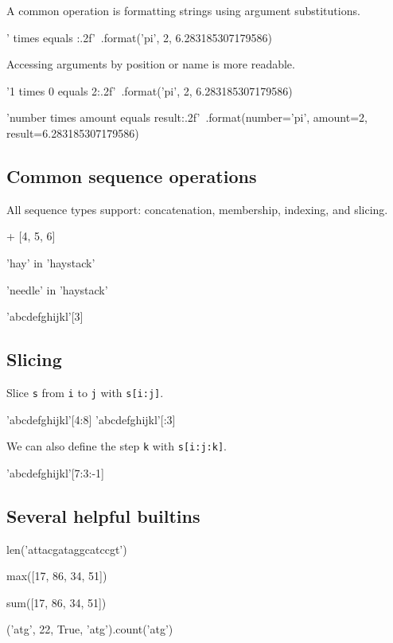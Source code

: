 \documentclass[aspectratio=1610,slidestop]{beamer}
\begin{document}
\begin{pframe}
\vspace{-0.3cm}
A common operation is formatting strings using argument substitutions.
\begin{pyconsole}
'{} times {} equals {:.2f}'\
    .format('pi', 2, 6.283185307179586)
\end{pyconsole}
\medskip
\medskip
Accessing arguments by position or name is more readable.
\begin{pyconsole}
'{1} times {0} equals {2:.2f}'\
    .format('pi', 2, 6.283185307179586)

'{number} times {amount} equals {result:.2f}'\
    .format(number='pi', amount=2, result=6.283185307179586)
\end{pyconsole}
\end{pframe}


\subsection{Common sequence operations}
\begin{pframe}
All sequence types support: concatenation, membership, indexing, and slicing.
\begin{pyconsole}
[1, 2, 3] + [4, 5, 6]

'hay' in 'haystack'

'needle' in 'haystack'

'abcdefghijkl'[3]
\end{pyconsole}
\end{pframe}


\subsection{Slicing}
\begin{pframe}
 Slice \texttt{s} from \texttt{i} to
 \texttt{j} with \texttt{s[i:j]}.
\begin{pyconsole}
'abcdefghijkl'[4:8]
'abcdefghijkl'[:3]
\end{pyconsole}
\medskip
\medskip
 We can also define the step \texttt{k} with
 \texttt{s[i:j:k]}.
\begin{pyconsole}
'abcdefghijkl'[7:3:-1]
\end{pyconsole}
\end{pframe}


\subsection{Several helpful builtins}
\begin{pframe}
\begin{pyconsole}
len('attacgataggcatccgt')

max([17, 86, 34, 51])

sum([17, 86, 34, 51])

('atg', 22, True, 'atg').count('atg')
\end{pyconsole}
\end{pframe}
\end{document}
